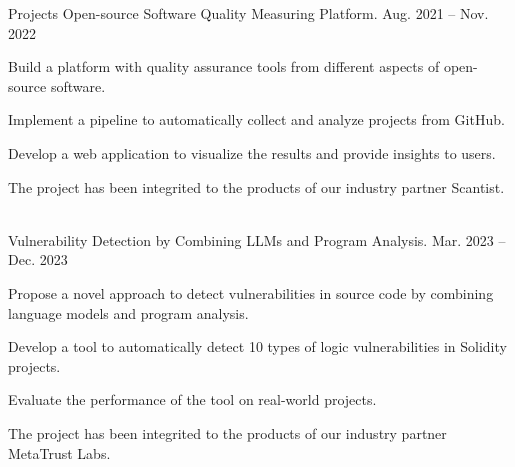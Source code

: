 \begin{rubric}{Projects}
\cventry
    {Open-source Software Quality Measuring Platform.} %
    {} %
    {} %
    {Aug. 2021 -- Nov. 2022} %
    {
      \begin{cvitems} %
        \item {Build a platform with quality assurance tools from different aspects of open-source software.}
        \item {Implement a pipeline to automatically collect and analyze projects from GitHub.}
        \item {Develop a web application to visualize the results and provide insights to users.}
        \item {The project has been integrited to the products of our industry partner Scantist.}
      \end{cvitems}
    }

\\

\cventry
    {Vulnerability Detection by Combining LLMs and Program Analysis.} %
    {} %
    {} %
    {Mar. 2023 -- Dec. 2023}
    {
      \begin{cvitems}
        \item {Propose a novel approach to detect vulnerabilities in source code by combining language models and program analysis.}
        \item {Develop a tool to automatically detect 10 types of logic vulnerabilities in Solidity projects.}
        \item {Evaluate the performance of the tool on real-world projects.}
        \item {The project has been integrited to the products of our industry partner MetaTrust Labs.}
      \end{cvitems}
    }

\end{rubric}